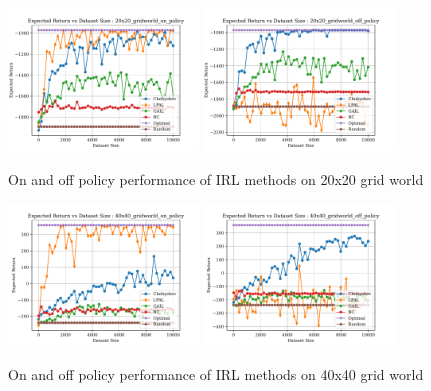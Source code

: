 \documentclass[11pt]{uai2023}
\begin{document}
\begin{figure}[htbp]
	\centering
	\includegraphics[width=0.45\textwidth]{../src/plots/returns/20x20_gridworld_on_policy_returns.pdf}
	\includegraphics[width=0.45\textwidth]{../src/plots/returns/20x20_gridworld_off_policy_returns.pdf}
	\caption{On and off policy performance of IRL methods on 20x20 grid world}
	\label{fig:off_policy_vs_on_20}
\end{figure}

\begin{figure}[htbp]
	\centering
	\includegraphics[width=0.45\textwidth]{../src/plots/returns/40x40_gridworld_on_policy_returns.pdf}
	\includegraphics[width=0.45\textwidth]{../src/plots/returns/40x40_gridworld_off_policy_returns.pdf}
	\caption{On and off policy performance of IRL methods on 40x40 grid world}
	\label{fig:off_policy_vs_on_40}
\end{figure}
\end{document}
